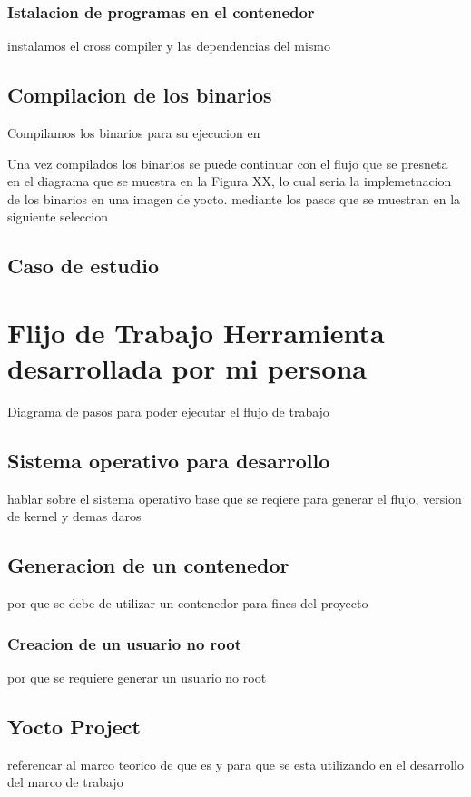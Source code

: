 \subsubsection{Istalacion de programas en el contenedor}

instalamos el cross compiler y las dependencias del mismo

\subsection{Compilacion de los binarios}

Compilamos los binarios para su ejecucion en

Una vez compilados los binarios se puede continuar con el flujo que se presneta en el diagrama que se muestra en la Figura XX, lo cual seria la implemetnacion de los binarios en una imagen de yocto. mediante los pasos que se muestran en la siguiente seleccion


\subsection{Caso de estudio}


\section{Flijo de Trabajo Herramienta desarrollada por mi persona}
Diagrama de pasos para poder ejecutar el flujo de trabajo

\subsection{Sistema operativo para desarrollo}
hablar sobre el sistema operativo base que se reqiere para generar el flujo, version de kernel y demas daros 

\subsection{Generacion de un contenedor}
por que se debe de utilizar un contenedor para fines del proyecto
\subsubsection{Creacion de un usuario no root}
por que se requiere generar un usuario no root 
\subsection{Yocto Project}
referencar al marco teorico de que es y para que se esta utilizando en el desarrollo del marco de trabajo
